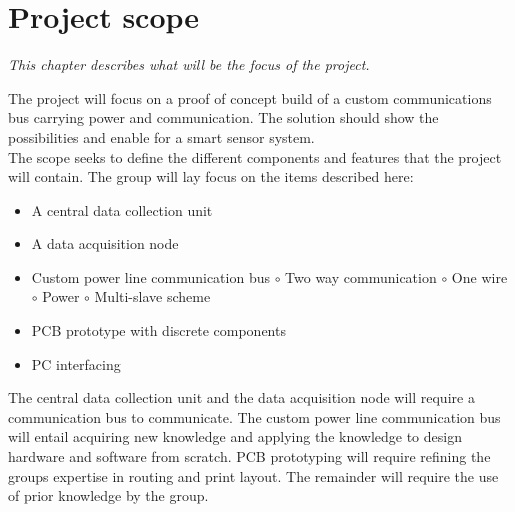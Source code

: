 \chapter{Project scope}

\textit{This chapter describes what will be the focus of the project.}

The project will focus on a proof of concept build of a custom communications bus carrying power and communication. The solution should show the possibilities and enable for a smart sensor system.\\
The scope seeks to define the different components and features that the project will contain. The group will lay focus on the items described here:
\begin{itemize}
	\item A central data collection unit
	\item A data acquisition node
	\item Custom power line communication bus 
	\subitem $\circ$ Two way communication
	\subitem $\circ$ One wire
	\subitem $\circ$ Power
	\subitem $\circ$ Multi-slave scheme
	\item PCB prototype with discrete components
	\item PC interfacing
\end{itemize}
The central data collection unit and the data acquisition node will require a communication bus to communicate. The custom power line communication bus will entail acquiring new knowledge and applying the knowledge to design hardware and software from scratch. PCB prototyping will require refining the groups expertise in routing and print layout. The remainder will require the use of prior knowledge by the group. 